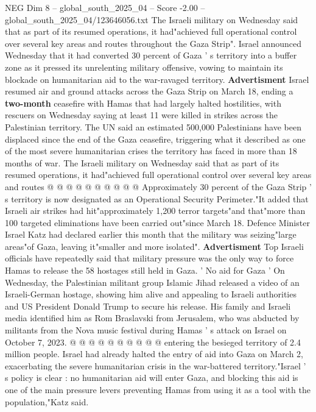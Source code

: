 \begin{textsample}{NEG Dim 8 – global\_south\_2025\_04 – Score -2.00 – global\_south\_2025\_04/123646056.txt}  \label{ex:f8_neg_045}
The Israeli military on Wednesday said that as part of its resumed operations, it had"achieved full operational control over several key areas and routes throughout the Gaza Strip".
Israel announced Wednesday that it had converted 30 percent of Gaza ' s territory into a buffer zone as it pressed its unrelenting military offensive, vowing to maintain its blockade on humanitarian aid to the war-ravaged territory. \textbf{Advertisment} Israel resumed air and ground attacks across the Gaza Strip on March 18, ending a \textbf{two-month} ceasefire with Hamas that had largely halted hostilities, with rescuers on Wednesday saying at least 11 were killed in strikes across the Palestinian territory.
The UN said an estimated 500,000 Palestinians have been displaced since the end of the Gaza ceasefire, triggering what it described as one of the most severe humanitarian crises the territory has faced in more than 18 months of war.
The Israeli military on Wednesday said that as part of its resumed operations, it had"achieved full operational control over several key areas and routes @ @ @ @ @ @ @ @ @ @ Approximately 30 percent of the Gaza Strip ' s territory is now designated as an Operational Security Perimeter."It added that Israeli air strikes had hit"approximately 1,200 terror targets"and that"more than 100 targeted eliminations have been carried out"since March 18.
Defence Minister Israel Katz had declared earlier this month that the military was seizing"large areas"of Gaza, leaving it"smaller and more isolated". \textbf{Advertisment} Top Israeli officials have repeatedly said that military pressure was the only way to force Hamas to release the 58 hostages still held in Gaza. ' No aid for Gaza ' On Wednesday, the Palestinian militant group Islamic Jihad released a video of an Israeli-German hostage, showing him alive and appealing to Israeli authorities and US President Donald Trump to secure his release.
His family and Israeli media identified him as Rom Braslavski from Jerusalem, who was abducted by militants from the Nova music festival during Hamas ' s attack on Israel on October 7, 2023. @ @ @ @ @ @ @ @ @ @ entering the besieged territory of 2.4 million people.
Israel had already halted the entry of aid into Gaza on March 2, exacerbating the severe humanitarian crisis in the war-battered territory."Israel ' s policy is clear : no humanitarian aid will enter Gaza, and blocking this aid is one of the main pressure levers preventing Hamas from using it as a tool with the population,"Katz said.

\end{textsample}
